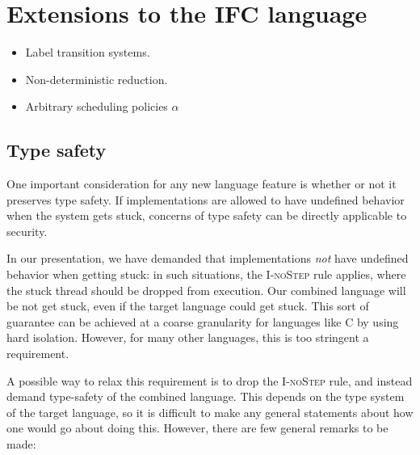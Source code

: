 \section{Extensions to the IFC language}
\label{sec:extensions}

\begin{itemize}
\item Label transition systems.
\item Non-deterministic reduction.
\item Arbitrary scheduling policies $\alpha$
\end{itemize}

\subsection{Type safety}
\label{sec:extensions:types}

One important consideration for any new language feature is whether
or not it preserves type safety.  If implementations are allowed to
have undefined behavior when the system gets stuck, concerns of type
safety can be directly applicable to security.

In our presentation, we have demanded that implementations \emph{not}
have undefined behavior when getting stuck: in such situations, the
\textsc{I-noStep} rule applies, where the stuck thread should be dropped
from execution.  Our combined language will be not get stuck, even if
the target language could get stuck.  This sort of guarantee can be
achieved at a coarse granularity for languages like C by using hard
isolation.  However, for many other languages, this is too stringent a
requirement.

A possible way to relax this requirement is to drop the \textsc{I-noStep}
rule, and instead demand type-safety of the combined language.  This
depends on the type system of the target language, so it is difficult to
make any general statements about how one would go about doing this.  However,
there are few general remarks to be made:

